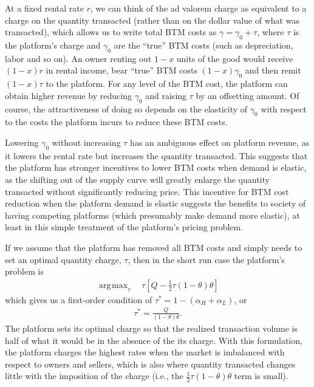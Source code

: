 \documentclass[12pt]{article}
\DeclareMathOperator*{\argmax}{\arg\!\max}
\begin{document}
At a fixed rental rate $r$, we can think of the ad valorem charge as equivalent to a charge on the quantity transacted (rather than on the dollar value of what was transacted), which allows us to write total BTM costs as $\gamma = \gamma_0 + \tau$, where $\tau$ is the platform's charge and $\gamma_0$ are the ``true'' BTM costs (such as depreciation, labor and so on). 
An owner renting out $1 - x$ units of the good would receive $(1 - x)r$ in rental income, bear ``true'' BTM costs $(1 - x)\gamma_0$ and then remit $(1-x)\tau$ to the platform. 
For any level of the BTM cost, the platform can obtain higher revenue by reducing $\gamma_0$ and raising $\tau$ by an offsetting amount.
Of course, the attractiveness of doing so depends on the elasticity of $\gamma_0$ with respect to the costs the platform incurs to reduce these BTM costs. 

Lowering $\gamma_0$ without increasing $\tau$ has an ambiguous effect on platform revenue, as it lowers the rental rate but increases the quantity transacted.
This suggests that the platform has stronger incentives to lower BTM costs when demand is elastic, as the shifting out of the supply curve will greatly enlarge the quantity transacted without significantly reducing price.
This incentive for BTM cost reduction when the platform demand is elastic suggests the benefits to society of having competing platforms (which presumably make demand more elastic), at least in this simple treatment of the platform's pricing problem. 

If we assume that the platform has removed all BTM costs and simply needs to set an optimal quantity charge, $\tau$, then in the short run case the platform's problem is 
\begin{align}
  \argmax_{\tau} \quad \tau \left[Q - \frac{1}{2}\tau (1-\theta)\theta \right]
 \end{align}
which gives us a first-order condition of $\tau^* = 1 - (\alpha_H + \alpha_L)$, or
\begin{align}
  \tau^* = \frac{Q}{(1-\theta)\theta}.  
\end{align}
The platform sets its optimal charge so that the realized transaction volume is half of what it would be in the absence of the its charge.
With this formulation, the platform charges the highest rates when the market is imbalanced with respect to owners and sellers, which is also where quantity transacted changes little with the imposition of the charge (i.e., the $\frac{1}{2} \tau (1-\theta)\theta$ term is small). 
\end{document}
